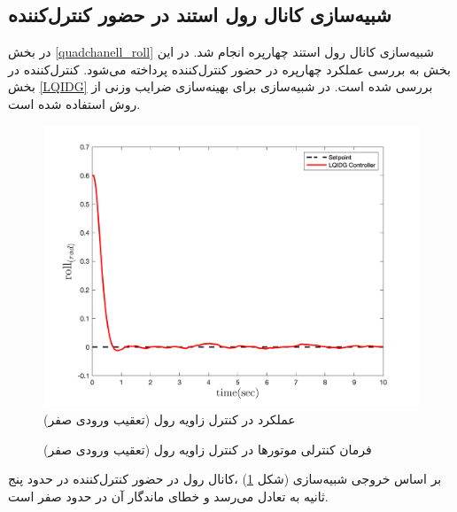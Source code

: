 \subsection{شبیه‌سازی کانال رول استند در حضور کنترل‌کننده }\label{roll_lqidg_section_simulation}
در بخش
\ref{quadchanell_roll}
شبیه‌سازی کانال رول استند چهارپره انجام شد. در این بخش به بررسی عملکرد چهارپره در حضور کنترل‌کننده  پرداخته می‌شود. کنترل‌کننده  در بخش
\ref{LQIDG}
بررسی شده است.
 در شبیه‌سازی برای بهینه‌سازی ضرایب وزنی  از روش
 \cite{Karimi2010}
استفاده شده است.
\begin{figure}[H]
	\includegraphics[width=.48\linewidth]{../Figures/MIL/LQIDG/Roll/lqidg_roll.png}
	\centering
	\caption{عملكرد  در کنترل زاويه رول (تعقیب ورودی صفر)}
	\label{lqidg_roll_fig_simulation}
\end{figure}
\begin{figure}[H]
	\centering
	\caption{‫‪فرمان کنترلی موتورها در کنترل زاویه رول (تعقیب ورودی صفر)}
\end{figure}

بر اساس خروجی شبیه‌سازی (شکل
\ref{lqidg_roll_fig_simulation})
،کانال رول در حضور کنترل‌کننده  در حدود پنج ثانیه به تعادل می‌رسد و خطای ماندگار آن در حدود صفر است.
